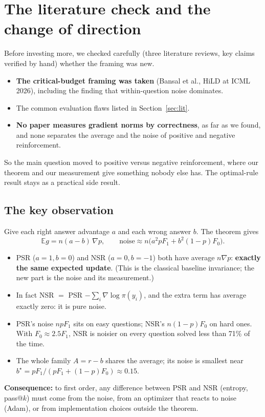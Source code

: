 \documentclass[11pt]{article}
\newcommand{\E}{\mathbb{E}}
\begin{document}
\section{The literature check and the change of direction}

\begin{why}
Before investing more, we checked carefully (three literature reviews, key claims verified by hand) whether the framing was new.
\end{why}
\begin{found}
\begin{itemize}[leftmargin=*,itemsep=1pt]
\item \textbf{The critical-budget framing was taken} (Bansal et al., HiLD at ICML 2026), including the finding that within-question noise dominates.
\item The common evaluation flaws listed in Section~\ref{sec:lit}.
\item \textbf{No paper measures gradient norms by correctness}, as far as we found, and none separates the average and the noise of positive and negative reinforcement.
\end{itemize}
\end{found}
So the main question moved to positive versus negative reinforcement, where our theorem and our measurement give something nobody else has. The optimal-rule result stays as a practical side result.

\subsection{The key observation}
Give each right answer advantage $a$ and each wrong answer $b$. The theorem gives
\[
\E g = n(a-b)\,\nabla p,\qquad \text{noise}\approx n\big(a^2pF_1+b^2(1-p)F_0\big).
\]
\begin{itemize}[leftmargin=*,itemsep=1pt]
\item PSR ($a=1,b=0$) and NSR ($a=0,b=-1$) both have average $n\nabla p$: \textbf{exactly the same expected update}. (This is the classical baseline invariance; the new part is the noise and its measurement.)
\item In fact NSR $=$ PSR $-\sum_i\nabla\log\pi(y_i)$, and the extra term has average exactly zero: it is pure noise.
\item PSR's noise $npF_1$ sits on easy questions; NSR's $n(1-p)F_0$ on hard ones. With $F_0\approx2.5F_1$, NSR is noisier on every question solved less than 71\% of the time.
\item The whole family $A=r-b$ shares the average; its noise is smallest near $b^\star=pF_1/(pF_1+(1-p)F_0)\approx0.15$.
\end{itemize}
\textbf{Consequence:} to first order, any difference between PSR and NSR (entropy, pass@$k$) must come from the noise, from an optimizer that reacts to noise (Adam), or from implementation choices outside the theorem.
\end{document}
